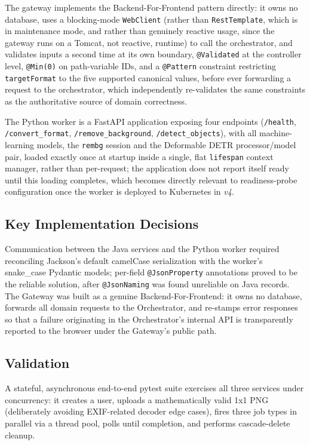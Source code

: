 \documentclass[twoside]{supsistudent}
\begin{document}
The gateway implements the Backend-For-Frontend pattern directly: it owns no database, uses a blocking-mode \texttt{WebClient} (rather than \texttt{RestTemplate}, which is in maintenance mode, and rather than genuinely reactive usage, since the gateway runs on a Tomcat, not reactive, runtime) to call the orchestrator, and validates inputs a second time at its own boundary, \texttt{@Validated} at the controller level, \texttt{@Min(0)} on path-variable IDs, and a \texttt{@Pattern} constraint restricting \texttt{targetFormat} to the five supported canonical values, before ever forwarding a request to the orchestrator, which independently re-validates the same constraints as the authoritative source of domain correctness.

The Python worker is a FastAPI application exposing four endpoints (\texttt{/health}, \\ \texttt{/convert\_format}, \texttt{/remove\_background}, \texttt{/detect\_objects}), with all machine-learning models, the \texttt{rembg} session and the Deformable DETR processor/model pair, loaded exactly once at startup inside a single, flat \texttt{lifespan} context manager, rather than per-request; the application does not report itself ready until this loading completes, which becomes directly relevant to readiness-probe configuration once the worker is deployed to Kubernetes in \emph{v4}.

\subsection{Key Implementation Decisions}
Communication between the Java services and the Python worker required reconciling Jackson's default camelCase serialization with the worker's snake\_case Pydantic models; per-field \texttt{@JsonProperty} annotations proved to be the reliable solution, after \texttt{@JsonNaming} was found unreliable on Java records. The Gateway was built as a genuine Backend-For-Frontend: it owns no database, forwards all domain requests to the Orchestrator, and re-stamps error responses so that a failure originating in the Orchestrator's internal API is transparently reported to the browser under the Gateway's public path.

\subsection{Validation}
A stateful, asynchronous end-to-end pytest suite exercises all three services under concurrency: it creates a user, uploads a mathematically valid 1x1 PNG (deliberately avoiding EXIF-related decoder edge cases), fires three job types in parallel via a thread pool, polls until completion, and performs cascade-delete cleanup.
\end{document}
